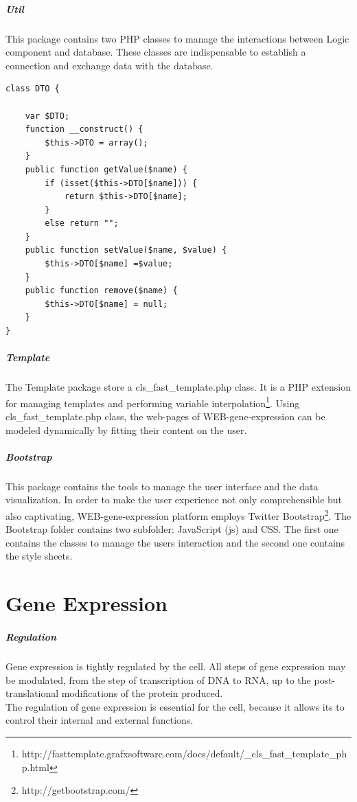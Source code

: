 \documentclass[a4paper]{report}
\begin{document}
\paragraph{Util} This package contains two PHP classes to manage the interactions between Logic component and database. These classes are indispensable to establish a connection and exchange data with the database.
\begin{lstlisting}[title={DTO.php class.},frame=trBL]	
class DTO {

	var $DTO;
	function __construct() {
		$this->DTO = array();
	}
	public function getValue($name) {
		if (isset($this->DTO[$name])) {
			return $this->DTO[$name];
		}
		else return "";
	}
	public function setValue($name, $value) {
		$this->DTO[$name] =$value;
	}
	public function remove($name) {
		$this->DTO[$name] = null;
	}
}
\end{lstlisting}

\paragraph{Template} The Template package store a cls\_fast\_template.php class. It is a PHP extension for managing templates and performing variable interpolation\footnote{http://fasttemplate.grafxsoftware.com/docs/default/\_cls\_fast\_template\_php.html}.
Using cls\_fast\_template.php class, the web-pages of WEB-gene-expression can be modeled dynamically by fitting their content on the user.

\paragraph{Bootstrap} This package contains the tools to manage the user interface and the data visualization. In order to make the user experience not only comprehensible but also captivating, WEB-gene-expression platform employs Twitter Bootstrap\footnote{http://getbootstrap.com/}. The Bootstrap folder contains two subfolder: JavaScript (js) and CSS. The first one contains the classes to manage the users interaction and the second one contains the style sheets. 

\chapter{Gene Expression}
\paragraph{Regulation}
Gene expression is tightly regulated by the cell. All steps of gene expression may be modulated, from the step of transcription of DNA to RNA, up to the post-translational modifications of the protein produced.\\
The regulation of gene expression is essential for the cell, because it allows its to control their internal and external functions.
\end{document}
